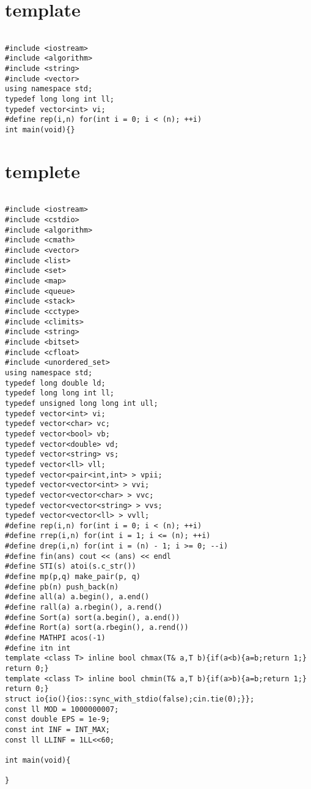\documentclass[a4j,titlepage]{jarticle} %
\begin{document}
\color{white}
\section{template}
\color{black}
\begin{lstlisting}[caption=template]

#include <iostream>
#include <algorithm>
#include <string>
#include <vector>
using namespace std;
typedef long long int ll;
typedef vector<int> vi;
#define rep(i,n) for(int i = 0; i < (n); ++i)
int main(void){}

\end{lstlisting}

\color{white}
\section{templete}
\color{black}
\begin{lstlisting}[caption=templete]

#include <iostream>
#include <cstdio>
#include <algorithm>
#include <cmath>
#include <vector>
#include <list>
#include <set>
#include <map>
#include <queue>
#include <stack>
#include <cctype>
#include <climits>
#include <string>
#include <bitset>
#include <cfloat>
#include <unordered_set>
using namespace std;
typedef long double ld;
typedef long long int ll;
typedef unsigned long long int ull;
typedef vector<int> vi;
typedef vector<char> vc;
typedef vector<bool> vb;
typedef vector<double> vd;
typedef vector<string> vs;
typedef vector<ll> vll;
typedef vector<pair<int,int> > vpii;
typedef vector<vector<int> > vvi;
typedef vector<vector<char> > vvc;
typedef vector<vector<string> > vvs;
typedef vector<vector<ll> > vvll;
#define rep(i,n) for(int i = 0; i < (n); ++i)
#define rrep(i,n) for(int i = 1; i <= (n); ++i)
#define drep(i,n) for(int i = (n) - 1; i >= 0; --i)
#define fin(ans) cout << (ans) << endl
#define STI(s) atoi(s.c_str())
#define mp(p,q) make_pair(p, q)
#define pb(n) push_back(n)
#define all(a) a.begin(), a.end()
#define rall(a) a.rbegin(), a.rend()
#define Sort(a) sort(a.begin(), a.end())
#define Rort(a) sort(a.rbegin(), a.rend())
#define MATHPI acos(-1)
#define itn int
template <class T> inline bool chmax(T& a,T b){if(a<b){a=b;return 1;} return 0;}
template <class T> inline bool chmin(T& a,T b){if(a>b){a=b;return 1;} return 0;}
struct io{io(){ios::sync_with_stdio(false);cin.tie(0);}};
const ll MOD = 1000000007;
const double EPS = 1e-9;
const int INF = INT_MAX;
const ll LLINF = 1LL<<60;

int main(void){

}

\end{lstlisting}
\end{document}
